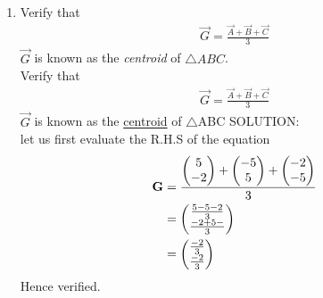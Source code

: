 \documentclass[11pt]{book}
\begin{document}
\begin{enumerate}[label=\thesection.\arabic*.,ref=\thesection.\theenumi]
\item Verify that 
		\begin{align}
			\vec{G}=\frac{\vec{A}+\vec{B}+\vec{C}}{3}
		\end{align}
$\vec{G}$ is known as the {\em centroid} of $\triangle ABC$.\\
Verify that\\
\begin{align}
 \vec{G}=\frac{\vec{A}+\vec{B}+\vec{C}}{3}   
\end{align}
$\vec{G}$ is known as the \underline{centroid} of $\triangle$ABC 
SOLUTION:\\
let us first evaluate the R.H.S of the equation
\begin{equation}
\begin{split}
\label{eq:centroid}
    \vec{G}&= \frac{\myvec{5\\-2}+\myvec{-5\\5}+\myvec{-2\\-5}}{3}\\    
    &= \myvec{\frac{5-5-2}{3} \\ \frac{-2+5-}{3}}\\
     &= \myvec{\frac{-2}{3}\\ \frac{-2}{3}}
\end{split}
\end{equation}
Hence verified.



\end{enumerate}
\end{document}

